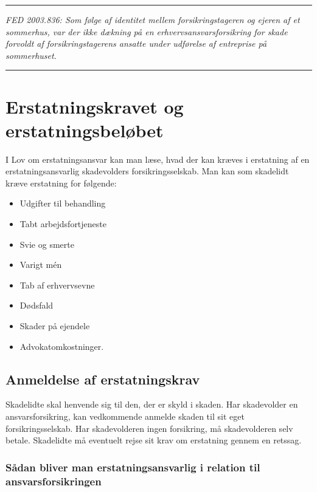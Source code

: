 \documentclass[]{book}
\providecommand{\tightlist}{%
  \setlength{\itemsep}{0pt}\setlength{\parskip}{0pt}}
\begin{document}
\begin{center}\rule{0.5\linewidth}{\linethickness}\end{center}

\emph{FED 2003.836: Som følge af identitet mellem forsikringstageren og ejeren af et sommerhus, var der ikke dækning på en erhvervsansvarsforsikring for skade forvoldt af forsikringstagerens ansatte under udførelse af entreprise på sommerhuset.}

\begin{center}\rule{0.5\linewidth}{\linethickness}\end{center}

\hypertarget{erstatningskravet-og-erstatningsbelbet}{%
\section{Erstatningskravet og erstatningsbeløbet}\label{erstatningskravet-og-erstatningsbelbet}}

I Lov om erstatningsansvar kan man læse, hvad der kan kræves i erstatning af en erstatningsansvarlig skadevolders forsikringsselskab. Man kan som skadelidt kræve erstatning for følgende:

\begin{itemize}
\tightlist
\item
  Udgifter til behandling
\item
  Tabt arbejdsfortjeneste
\item
  Svie og smerte
\item
  Varigt mén
\item
  Tab af erhvervsevne
\item
  Dødsfald
\item
  Skader på ejendele
\item
  Advokatomkostninger.
\end{itemize}

\hypertarget{anmeldelse-af-erstatningskrav}{%
\subsection{Anmeldelse af erstatningskrav}\label{anmeldelse-af-erstatningskrav}}

Skadelidte skal henvende sig til den, der er skyld i skaden. Har skadevolder en ansvarsforsikring, kan vedkommende anmelde skaden til sit eget forsikringsselskab. Har skadevolderen ingen forsikring, må skadevolderen selv betale. Skadelidte må eventuelt rejse sit krav om erstatning gennem en retssag.

\hypertarget{sadan-bliver-man-erstatningsansvarlig-i-relation-til-ansvarsforsikringen}{%
\subsubsection{Sådan bliver man erstatningsansvarlig i relation til ansvarsforsikringen}\label{sadan-bliver-man-erstatningsansvarlig-i-relation-til-ansvarsforsikringen}}
\end{document}
